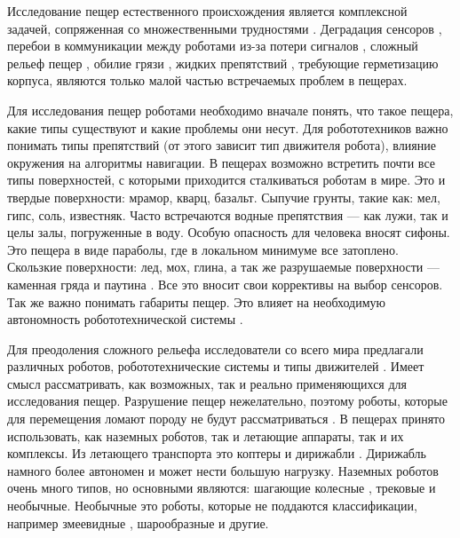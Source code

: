 Исследование пещер естественного происхождения является комплексной задачей, сопряженная со множественными трудностями \cite{Zhang2017a, Frumkin2019}. Деградация сенсоров \cite{Huang2019}, перебои в коммуникации между роботами из-за потери сигналов \cite{Vaquero2018, Thangavelautham2017}, сложный рельеф пещер \cite{Thangavelautham2017}, обилие грязи \cite{Baker2004}, жидких препятствий \cite{Morris2006}, требующие герметизацию корпуса, являются только малой частью встречаемых проблем в пещерах. 

Для исследования пещер роботами необходимо вначале понять, что такое пещера, какие типы существуют и какие проблемы они несут. Для робототехников важно понимать типы препятствий (от этого зависит тип движителя робота), влияние окружения на алгоритмы навигации. В пещерах возможно встретить почти все типы поверхностей, с которыми приходится сталкиваться роботам в мире. Это и твердые поверхности: мрамор, кварц, базальт. Сыпучие грунты, такие как: мел, гипс, соль, известняк. Часто встречаются водные препятствия — как лужи, так и целы залы, погруженные в воду. Особую опасность для человека вносят сифоны. Это пещера в виде параболы, где в локальном минимуме все затоплено. Скользкие поверхности: лед, мох, глина, а так же разрушаемые поверхности — каменная гряда и паутина \cite{1960,1963,1969,1971}. Все это вносит свои коррективы на выбор сенсоров. Так же важно понимать габариты пещер. Это влияет на необходимую автономность робототехнической системы \cite{Mascarich2018a}. 

Для преодоления сложного рельефа исследователи со всего мира предлагали различных роботов, робототехнические системы и типы движителей \cite{Morris2006a}. Имеет смысл рассматривать, как возможных, так и реально применяющихся для исследования пещер. Разрушение пещер нежелательно, поэтому роботы, которые для перемещения ломают породу не будут рассматриваться \cite{Semini2016}. В пещерах принято использовать, как наземных роботов, так и летающие аппараты, так и их комплексы. Из летающего транспорта это коптеры \cite{Papachristos2019,Scaramuzza2014,Zingg2010} и дирижабли \cite{Huang2019}. Дирижабль намного более автономен и может нести большую нагрузку. Наземных роботов очень много типов, но основными являются: шагающие \cite{Tan2016,Lynch2019} колесные \cite{Molyneaux2016,Vaquero2018}, трековые \cite{Reddy2015} и необычные. Необычные это роботы, которые не поддаются классификации, например змеевидные \cite{Ye2007,Borenstein2007}, шарообразные \cite{Thangavelautham2017,Dubowsky2008,Dang2019} и другие.

